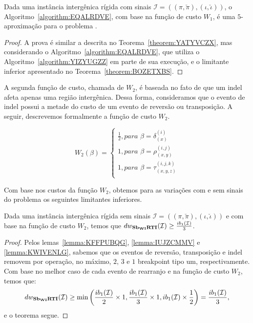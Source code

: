 \begin{theorem}\label{theorem:XMRIBCHD}
Dada uma instância intergênica rígida com sinais $\mathcal{I}=((\pi,\breve\pi),(\iota,\breve\iota))$, o Algoritmo~\ref{algorithm:EQALRDVE}, com base na função de custo $W_1$, é uma $5$-aproximação para o problema \SbWIRI{}.
\end{theorem}
\begin{proof}
A prova é similar a descrita no Teorema~\ref{theorem:YATYVCZX}, mas considerando o Algoritmo~\ref{algorithm:EQALRDVE}, que utiliza o Algoritmo~\ref{algorithm:YIZYUGZZ} em parte de sua execução, e o limitante inferior apresentado no Teorema~\ref{theorem:BOZETXBS}.
\end{proof}

A segunda função de custo, chamada de $W_2$, é baseada no fato de que um indel afeta apenas uma região intergênica. Dessa forma, consideramos que o evento de indel possui a metade do custo de um evento de reversão ou transposição. A seguir, descrevemos formalmente a função de custo $W_2$.

$$
  W_2(\beta) = \begin{cases}
      \frac{1}{2}, \textit{para } \beta = \delta_{(x)}^{(i)} \\
      1, \textit{para } \beta = \rho_{(x,y)}^{(i,j)} \\
      1, \textit{para } \beta = \tau_{(x,y,z)}^{(i,j,k)} \\
  \end{cases}
$$

Com base nos custos da função $W_2$, obtemos para as variações com e sem sinais do problema \SbWIRTI{} os seguintes limitantes inferiores.

\begin{theorem}\label{theorem:HFHHZDMV}
Dada uma instância intergênica rígida sem sinais $\mathcal{I}=((\pi,\breve\pi),(\iota,\breve\iota))$ e com base na função de custo $W_2$, temos que $dw_{\textbf{Sb\textsubscript{WI}RTI}}(\mathcal{I}) \ge \frac{ib_1(\mathcal{I})}{3}$.
\begin{proof}
Pelos lemas~\ref{lemma:KFFPUBQG}, \ref{lemma:IUJZCMMV} e \ref{lemma:KWIVENLG}, sabemos que os eventos de reversão, transposição e indel removem por operação, no máximo, $2$, $3$ e $1$ breakpoint tipo um, respectivamente. Com base no melhor caso de cada evento de rearranjo e na função de custo $W_2$, temos que:
$$dw_{\textbf{Sb\textsubscript{WI}RTI}}(\mathcal{I}) \ge \min\left(\frac{ib_1(\mathcal{I})}{2} \times 1,\frac{ib_1(\mathcal{I})}{3} \times 1, ib_1(\mathcal{I}) \times \frac{1}{2}\right) = \frac{ib_1(\mathcal{I})}{3},$$ e o teorema segue.
\end{proof}
\end{theorem}

